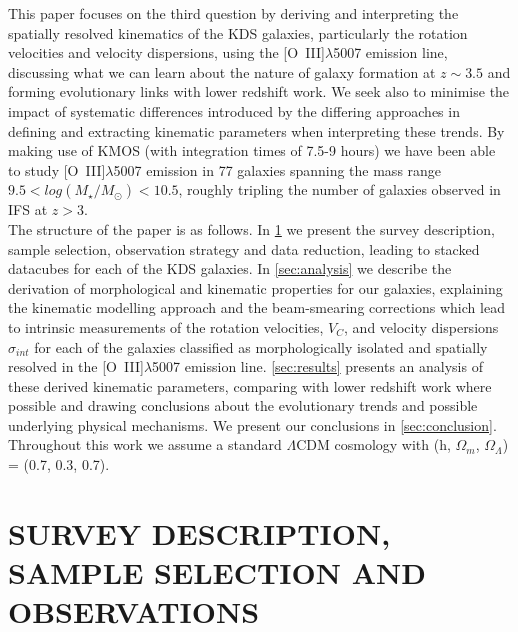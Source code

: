 \documentclass[fleqn,usenatbib]{mn2e}
\begin{document}
This paper focuses on the third question by deriving and interpreting the spatially resolved kinematics of the KDS galaxies, particularly the rotation velocities and velocity dispersions, using the [O~{\sc III}]$\lambda$5007 emission line, discussing what we can learn about the nature of galaxy formation at $z \sim 3.5$ and forming evolutionary links with lower redshift work.
We seek also to minimise the impact of systematic differences introduced by the differing approaches in defining and extracting kinematic parameters when interpreting these trends.  
By making use of KMOS (with integration times of 7.5-9 hours) we have been able to study [O~{\sc III}]$\lambda$5007 emission in 77 galaxies spanning the mass range $9.5 < log(M_{\star}/M_{\odot}) < 10.5$, roughly tripling the number of galaxies observed in IFS at $z > 3$. \\

The structure of the paper is as follows. In \cref{sec:Survey_and_data} we present the survey description, sample selection, observation strategy and data reduction, leading to stacked datacubes for each of the KDS galaxies.
In \cref{sec:analysis} we describe the derivation of morphological and kinematic properties for our galaxies, explaining the kinematic modelling approach and the beam-smearing corrections which lead to intrinsic measurements of the rotation velocities, $V_{C}$, and velocity dispersions $\sigma_{int}$ for each of the galaxies classified as morphologically isolated and spatially resolved in the [O~{\sc III}]$\lambda$5007 emission line.
\cref{sec:results} presents an analysis of these derived kinematic parameters, comparing with lower redshift work where possible and drawing conclusions about the evolutionary trends and possible underlying physical mechanisms.
We present our conclusions in \cref{sec:conclusion}.
Throughout this work we assume a standard $\Lambda$CDM cosmology with (h, $\Omega_{m}$, $\Omega_{\Lambda}$) = (0.7, 0.3, 0.7). 

\section{SURVEY DESCRIPTION, SAMPLE SELECTION AND OBSERVATIONS}\label{sec:Survey_and_data}
\end{document}

